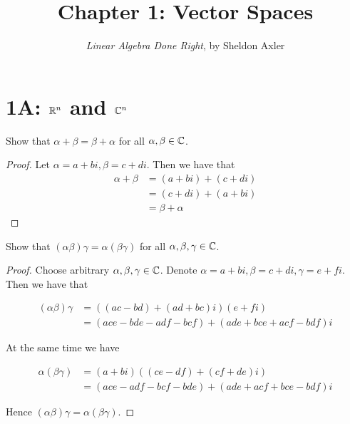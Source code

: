 \documentclass{extarticle}
\title{\vspace{-2em}Chapter 1: Vector Spaces}
\author{\emph{Linear Algebra Done Right}, by Sheldon Axler}
\date{}
\begin{document}
\maketitle


\section*{1A: $\mathbb{R}^n$ and $\mathbb{C}^n$}

\begin{problem}{1}
    Show that \(\alpha + \beta = \beta + \alpha\) for all \(\alpha, 
    \beta \in \mathbb{C}\). 
\end{problem}


\begin{proof}
    Let \(\alpha = a + bi, \beta = c + di\). Then we have that 
    \begin{align*}
        \alpha + \beta 
        &= (a + bi) + (c + di) \\ 
        &= (c + di) + (a + bi) \\ 
        &= \beta + \alpha
    \end{align*}
\end{proof}

\begin{problem}{3}
    Show that \((\alpha \beta) \gamma = \alpha(\beta \gamma)\) for all \(\alpha,
    \beta, \gamma \in \mathbb{C}\). 
\end{problem}


\begin{proof}
Choose arbitrary \(\alpha, \beta, \gamma \in \mathbb{C}\). Denote \(\alpha = a + bi,
\beta=c + di, \gamma = e + fi\). Then we have that 

\begin{align*}
    (\alpha \beta) \gamma 
    &= ((ac - bd) + (ad + bc)i ) (e + fi) \\ 
    &=( ace - bde - adf - bcf ) + (ade + bce + acf - bdf)i
\end{align*}

At the same time we have 

\begin{align*}
    \alpha (\beta \gamma) 
    &= (a + bi)((ce - df) + (cf + de)i) \\ 
    &= (ace - adf - bcf - bde) + (ade + acf + bce - bdf)i
\end{align*}

Hence \((\alpha \beta)\gamma = \alpha (\beta \gamma)\). 

\end{proof}
\end{document}
